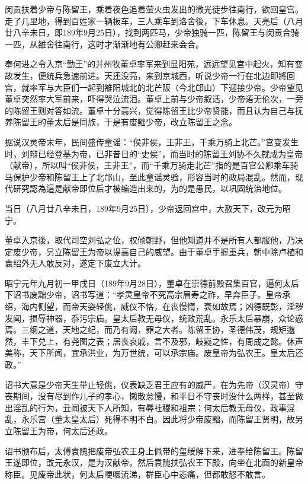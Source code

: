 闵贡扶着少帝与陈留王，乘着夜色追着萤火虫发出的微光徒步往南行，欲回皇宫。走了几里地，得到百姓家一辆板车，三人乘车到洛舍後，下车休息。天亮后（八月廿八辛未日，即189年9月25日），找到两匹马，少帝独骑一匹，陈留王与闵贡合骑一匹，从雒舍往南行，这时才渐渐地有公卿赶来会合。

奉何进之令入京“勤王”的并州牧董卓率军来到显阳苑，远远望见宫中起火，知有变故发生，便统兵急速前进。天还没亮，来到京城西，听说少帝一行在北边即將回宫，就率军与大臣们一起到雒阳城北的北芒阪（今北邙山）下迎接少帝。少帝望见董卓突然率大军前来，吓得哭泣流泪。董卓上前与少帝叙话，少帝语无伦次，一旁的陈留王则对答如流。董卓十分高兴，觉得陈留王比少帝贤能，而且认为自己与抚养陈留王的董太后是同族，于是有废黜少帝，改立陈留王之念。

据说汉灵帝末年，民间盛传童谣：“侯非侯，王非王，千乘万骑上北芒。”宫变发生时，刘辩已经登基为帝，已非昔日的“史侯”，而当时的陈留王刘协不久就成为皇帝（献帝），所以叫“侯非侯，王非王”，而“千乘万骑走北芒”指的是百官公卿乘车骑马保护少帝和陈留王上了北邙山，至此童谣灵验，形容当时的政局混乱。然而，现代研究認為這是献帝即位后才被编造出来的，为的是愚民，以巩固统治地位。

当日（八月廿八辛未日，189年9月25日），少帝返回宫中，大赦天下，改元为昭宁。

董卓入京後，取代司空刘弘之位，权倾朝野，但他知道并不是所有人都服他，乃决定废少帝，另立陈留王为帝以提高自己的威望。由于董卓手握重兵，朝中除卢植和袁绍外无人敢反对，遂定下废立大计。

昭宁元年九月初一甲戌日（189年9月28日），董卓在崇德前殿召集百官，逼何太后下诏书废黜少帝，诏书写道：“孝灵皇帝不究高宗眉寿之祚，早弃臣子。皇帝承绍，海内侧望，而帝天姿轻佻，威仪不恪，在丧慢惰，衰如故焉；凶德既彰，淫秽发闻，损辱神器，忝污宗庙。皇太后教无母仪，统政荒乱。永乐太后暴崩，众论惑焉。三纲之道，天地之纪，而乃有阙，罪之大者。陈留王协，圣德伟茂，规矩邈然，丰下兑上，有尧图之表；居丧哀戚，言不及邪，岐嶷之性，有周成之懿。休声美称，天下所闻，宜承洪业，为万世统，可以承宗庙。废皇帝为弘农王。皇太后还政。”

诏书大意是少帝天生举止轻佻，仪表缺乏君王应有的威严，在为先帝（汉灵帝）守丧期间，没有尽到作儿子的孝心，懒散怠慢，和平日不守丧时没什么两样，甚至做出淫乱的行为，丑闻被天下人所知，有辱社稷和祖宗；何太后教无母仪，政事混乱，永乐宫（董太皇太后）死得不明不白。因此将少帝废黜，而陈留王贤明，故另立陈留王为帝，何太后还政。

诏书颁布后，太傅袁隗把废帝弘农王身上佩带的玺绶解下来，进奉给陈留王。陈留王遂即位，改元永汉，是为汉献帝。然后袁隗扶弘农王下殿，向坐在北面的新皇帝称臣。见废帝此状，何太后哽咽流涕，群臣心中悲痛，但都敢怒不敢言。

